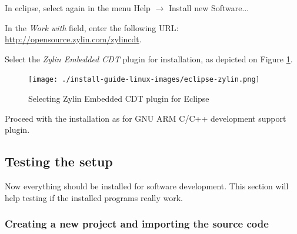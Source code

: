\documentclass[a4paper, 10pt]{article}
\begin{document}
In eclipse, select again in the menu Help $\rightarrow$ Install new Software...

In the \emph{Work with} field, enter the following URL:
\url{http://opensource.zylin.com/zylincdt}.

Select the \emph{Zylin Embedded CDT} plugin for installation,
as depicted on Figure \ref{fig:eclipse-zylin}.

    \begin{figure}[H]
    \centering
        \texttt{[image: ./install-guide-linux-images/eclipse-zylin.png]}
        \caption{Selecting Zylin Embedded CDT plugin for Eclipse}
        \label{fig:eclipse-zylin}
    \end{figure}

Proceed with the installation as for GNU ARM C/C++ development support plugin.


\subsection{Testing the setup}

Now everything should be installed for software development.
This section will help testing if the installed programs really work.

\subsubsection{Creating a new project and importing the source code}





\end{document}
